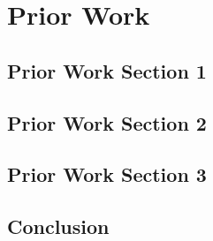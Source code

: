 %
\chapter{Prior Work}
\label{sec:priorwork}


\Blindtext[2][1]

\section{Prior Work Section 1}
\label{sec:priorwork:sec1}

\Blindtext[2][2]

\section{Prior Work Section 2}
\label{sec:priorwork:sec2}

\Blindtext[3][2]

\section{Prior Work Section 3}
\label{sec:priorwork:sec3}

\Blindtext[4][2]

\section{Conclusion}
\label{sec:priorwork:conclusion}

\Blindtext[2][1]
